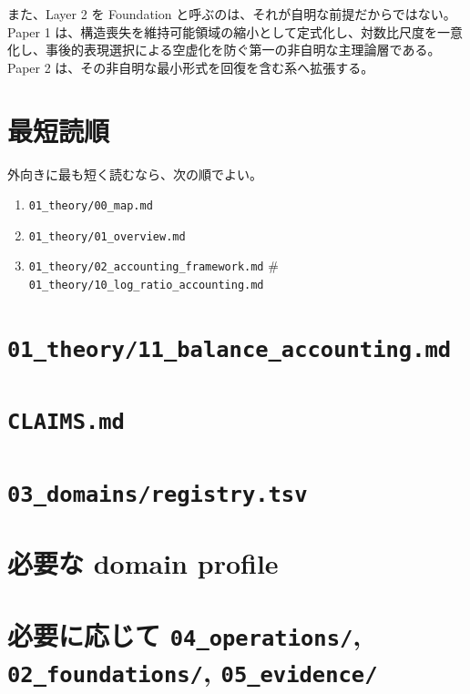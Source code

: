 \documentclass[12pt,a4paper]{article}
\begin{document}
また、Layer 2 を Foundation と呼ぶのは、それが自明な前提だからではない。Paper 1 は、構造喪失を維持可能領域の縮小として定式化し、対数比尺度を一意化し、事後的表現選択による空虚化を防ぐ第一の非自明な主理論層である。Paper 2 は、その非自明な最小形式を回復を含む系へ拡張する。

\section{最短読順}\label{ux6700ux77edux8aadux9806}

外向きに最も短く読むなら、次の順でよい。

\begin{enumerate}
\def\labelenumi{\arabic{enumi}.}
\tightlist
\item
  \texttt{01\_theory/00\_map.md}
\item
  \texttt{01\_theory/01\_overview.md}
\item
  \texttt{01\_theory/02\_accounting\_framework.md} \# \texttt{01\_theory/10\_log\_ratio\_accounting.md}
\end{enumerate}

\section{\texorpdfstring{\texttt{01\_theory/11\_balance\_accounting.md}}{01\_theory/11\_balance\_accounting.md}}\label{theory11_balance_accounting.md}

\section{\texorpdfstring{\texttt{CLAIMS.md}}{CLAIMS.md}}\label{claims.md}

\section{\texorpdfstring{\texttt{03\_domains/registry.tsv}}{03\_domains/registry.tsv}}\label{domainsregistry.tsv}

\section{必要な domain profile}\label{ux5fc5ux8981ux306a-domain-profile}

\section{\texorpdfstring{必要に応じて \texttt{04\_operations/}, \texttt{02\_foundations/}, \texttt{05\_evidence/}}{必要に応じて 04\_operations/, 02\_foundations/, 05\_evidence/}}\label{ux5fc5ux8981ux306bux5fdcux3058ux3066-04_operations-02_foundations-05_evidence}
\end{document}
